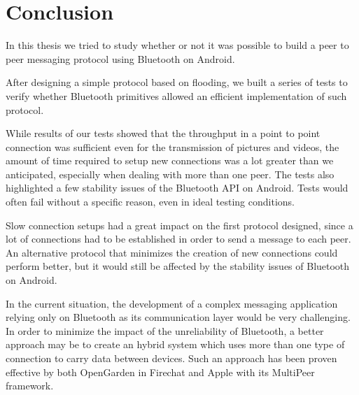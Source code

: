 \chapter{Conclusion}
In this thesis we tried to study whether or not it was possible to build a peer to peer messaging protocol using Bluetooth on Android.

After designing a simple protocol based on flooding, we built a series of tests to verify whether Bluetooth primitives allowed an efficient implementation of such protocol.

While results of our tests showed that the throughput in a point to point connection was sufficient even for the transmission of pictures and videos, the amount of time required to setup new connections was a lot greater than we anticipated, especially when dealing with more than one peer.
The tests also highlighted a few stability issues of the Bluetooth API on Android.
Tests would often fail without a specific reason, even in ideal testing conditions.

Slow connection setups had a great impact on the first protocol designed, since a lot of connections had to be established in order to send a message to each peer.
An alternative protocol that minimizes the creation of new connections could perform better, but it would still be affected by the stability issues of Bluetooth on Android.

In the current situation, the development of a complex messaging application relying only on Bluetooth as its communication layer would be very challenging.
In order to minimize the impact of the unreliability of Bluetooth, a better approach may be to create an hybrid system which uses more than one type of connection to carry data between devices.
Such an approach has been proven effective by both OpenGarden in Firechat and Apple with its MultiPeer framework.

